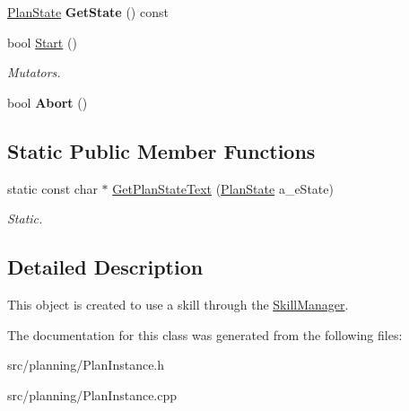 \begin{DoxyCompactItemize}
\hyperlink{class_plan_instance_a327a14fdda85d66c88d053b970a7b090}{Plan\+State} {\bfseries Get\+State} () const
\item 
\mbox{\label{class_plan_instance_ac91f66e0b1bf50a8d6be79c76781b47e}} 
bool \hyperlink{class_plan_instance_ac91f66e0b1bf50a8d6be79c76781b47e}{Start} ()
\begin{DoxyCompactList}\small\item\em Mutators. \end{DoxyCompactList}\item 
\mbox{\label{class_plan_instance_a803ee75828f7c000a94f6ec64123bfda}} 
bool {\bfseries Abort} ()
\end{DoxyCompactItemize}
\subsection*{Static Public Member Functions}
\begin{DoxyCompactItemize}
\item 
\mbox{\label{class_plan_instance_aa54626b50863483f03ac26d30040160a}} 
static const char $\ast$ \hyperlink{class_plan_instance_aa54626b50863483f03ac26d30040160a}{Get\+Plan\+State\+Text} (\hyperlink{class_plan_instance_a327a14fdda85d66c88d053b970a7b090}{Plan\+State} a\+\_\+e\+State)
\begin{DoxyCompactList}\small\item\em Static. \end{DoxyCompactList}\end{DoxyCompactItemize}


\subsection{Detailed Description}
This object is created to use a skill through the \hyperlink{class_skill_manager}{Skill\+Manager}. 

The documentation for this class was generated from the following files\+:\begin{DoxyCompactItemize}
\item 
src/planning/Plan\+Instance.\+h\item 
src/planning/Plan\+Instance.\+cpp\end{DoxyCompactItemize}
